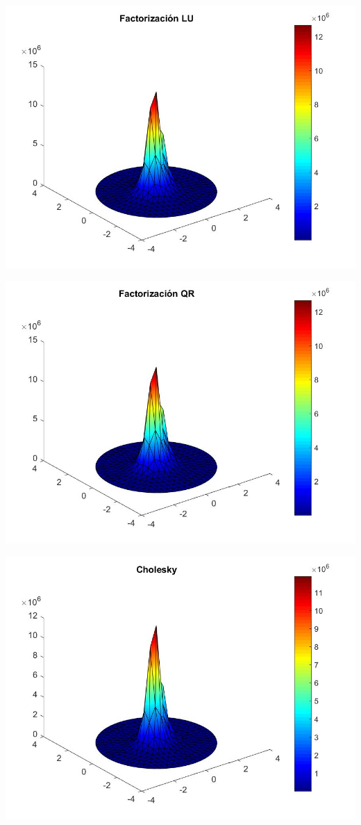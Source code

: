 \documentclass{memoria}
\begin{document}
{\includegraphics[width=16cm]{imagenes/SE/Resultados289_LU.jpg}}

{\includegraphics[width=16cm]{imagenes/SE/Resultados289_QR.jpg}}

{\includegraphics[width=16cm]{imagenes/SE/Resultados289_Ch.jpg}}
\end{document}
